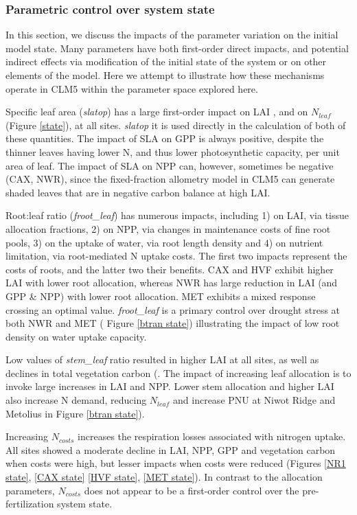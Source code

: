 \documentclass[draft,linenumbers]{agujournal}
\begin{document}
\subsubsection{Parametric control over system state}
In this section, we discuss the impacts of the parameter variation on the initial model state.  Many parameters have both first-order direct impacts, and potential indirect effects via modification of the initial state of the system or on other elements of the model. Here we attempt to illustrate how these mechanisms operate in CLM5 within the parameter space explored here. 

Specific leaf area (\emph{slatop}) has a large first-order impact on LAI , and on $N_{leaf}$ (Figure \ref{state}), at all sites. \emph{slatop} it is used directly in the calculation of both of these quantities. The impact of SLA on GPP is always positive, despite the thinner leaves having lower N, and thus lower photosynthetic capacity, per unit area of leaf. The impact of SLA on NPP can, however, sometimes be negative (CAX, NWR), since the fixed-fraction allometry model in CLM5 can generate shaded leaves that are in negative carbon balance at high LAI. 

Root:leaf ratio (\emph{froot\_leaf}) has numerous impacts, including 1) on LAI, via tissue allocation fractions, 2) on NPP, via changes in maintenance costs of fine root pools, 3) on the uptake of water, via root length density and 4) on nutrient limitation, via root-mediated N uptake costs. The first two impacts represent the costs of roots, and the latter two their benefits. CAX and HVF exhibit higher LAI with lower root allocation, whereas NWR has large reduction in LAI (and GPP \& NPP) with lower root allocation. MET exhibits a mixed response crossing an optimal value. \emph{froot\_leaf} is a primary control over drought stress at both NWR and MET ( Figure \ref{btran state}) illustrating the impact of low root density on water uptake capacity. 

Low values of \emph{stem\_leaf} ratio resulted in higher LAI at all sites, as well as declines in total vegetation carbon (.   The impact of increasing leaf allocation is to invoke large increases in LAI and NPP. Lower stem allocation and higher LAI also increase N demand, reducing $N_{leaf}$ and increase PNU at Niwot Ridge and Metolius in Figure \ref{btran state}). 

Increasing $N_{costs}$ increases the respiration losses associated with nitrogen uptake.  All sites showed a moderate decline in LAI, NPP, GPP and vegetation carbon when costs were high, but lesser impacts when costs were reduced (Figures \ref{NR1 state}, \ref{CAX state} \ref{HVF state}, \ref{MET state}). In contrast to the allocation parameters, $N_{costs}$ does not appear to be a first-order control over the pre-fertilization system state. 
\end{document}
